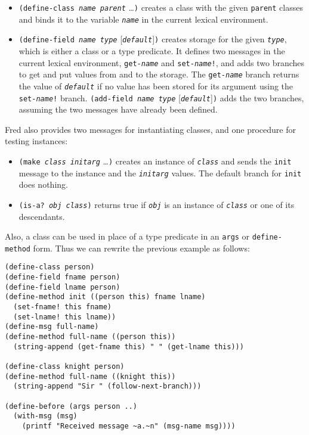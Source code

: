 \documentclass{article}
\newcommand{\code}[1]{\texttt{#1}}
\newcommand{\parm}[1]{\code{\textit{#1}}}
\begin{document}
\begin{itemize}
\item \code{(define-class \parm{name} \parm{parent}} \ldots\code{)}
      creates a class with the given \code{parent} classes and binds 
      it to the variable \parm{name} in the current lexical
      environment.
\item \code{(define-field \parm{name} \parm{type}}
      [\code{\parm{default}}]\code{)}
      creates storage for the given \parm{type}, which is either a
      class or a type predicate.  It defines two messages in the
      current lexical environment, \code{get-\parm{name}} and
      \code{set-\parm{name}!}, and adds two branches to get and put
      values from and to the storage.  The \code{get-\parm{name}}
      branch returns the value of \parm{default} if no value has been
      stored for its argument using the \code{set-\parm{name}!} branch.
      \code{(add-field \parm{name} \parm{type}}
      [\code{\parm{default}}]\code{)}
      adds the two branches, assuming the two messages have already
      been defined.
\end{itemize}

Fred also provides two messages for instantiating classes, and one
procedure for testing instances:

\begin{itemize}
\item \code{(make \parm{class} \parm{initarg}} \ldots\code{)} creates
      an instance of \parm{class} and sends the \code{init} message to
      the instance and the \parm{initarg} values.  The default branch
      for \code{init} does nothing.
\item \code{(is-a? \parm{obj} \parm{class})} returns true if
      \parm{obj} is an instance of \parm{class} or one of its descendants.
\end{itemize}

Also, a class can be used in place of a type predicate in an
\code{args} or \code{define-method} form.  Thus we can rewrite the
previous example as follows:

\begin{verbatim}
(define-class person)
(define-field fname person)
(define-field lname person)
(define-method init ((person this) fname lname)
  (set-fname! this fname)
  (set-lname! this lname))
(define-msg full-name)
(define-method full-name ((person this))
  (string-append (get-fname this) " " (get-lname this)))

(define-class knight person)
(define-method full-name ((knight this))
  (string-append "Sir " (follow-next-branch)))

(define-before (args person ..)
  (with-msg (msg)
    (printf "Received message ~a.~n" (msg-name msg))))
\end{verbatim}
\end{document}
